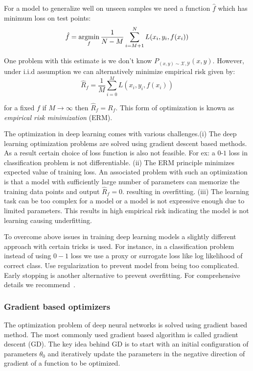 For a model to generalize well on unseen samples we need a function $\hat{f}$ which has minimum loss on test points:
\begin{equation}
    \hat{f} = \operatorname*{argmin}_f \frac{1}{N-M} \sum_{i={M+1}}^N L(x_i,y_i,f(x_i))
\end{equation}

One problem with this estimate is we don't know $P_{(x,y)\sim \mathcal{X},\mathcal{Y}}(x,y)$. 
However, under i.i.d assumption we can alternatively minimize empirical risk given by:
\begin{equation}
    \hat{R}_f =  \frac{1}{M} \sum_{i=0}^M L(x_i,y_i,f(x_i))
\end{equation}

for a fixed $f$ if $M\rightarrow\infty$ then $\hat{R}_f=R_f$. This form of optimization is known as \emph{empirical risk minimization} (ERM).  

The optimization in deep learning comes with various challenges.(i) The deep learning optimization problems are solved using gradient descent based methods. As a result certain choice of loss function is also not feasible. For ex: a $0$-$1$ loss in classification problem is not differentiable. 
(ii) The ERM principle minimizes expected value of training loss. An associated problem with such an optimization is that a model with sufficiently large number of parameters can memorize the training data points and output $\hat{R}_f = 0.$ resulting in overfitting. 
(iii) The learning task can be too complex for a model or a model is not expressive enough due to limited parameters. This results in high empirical risk indicating the model is not learning causing underfitting. 

To overcome above issues in training deep learning models a slightly different approach with certain tricks is used. For instance, in a classification problem instead of using $0-1$ loss we use a proxy or surrogate loss like log likelihood of correct class. Use regularization to prevent model from being too complicated. Early stopping is another alternative to prevent overfitting. For comprehensive details we recommend~\cite{Goodfellow-et-al-2016}.

\subsubsection{Gradient based optimizers}
\label{sub:gbl}
The optimization problem of deep neural networks is solved using gradient based method. The most commonly used gradient based algorithm is called gradient descent (GD). The key idea behind GD is to start with an initial configuration of parameters $\theta_0$ and iteratively update the parameters in the negative direction of gradient of a function to be optimized. 

